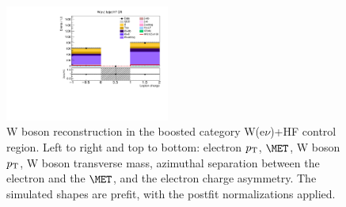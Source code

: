 \begin{figure}[tbp]
\begin{center}
    \includegraphics[width=0.48\textwidth]{figures/wlnhbb2016/boosted/WenWHHeavyFlavorFJCR_lepton1Charge.pdf}
    \caption{W boson reconstruction in the boosted category W(e$\nu$)+HF control region.
    Left to right and top to bottom: electron $p_{\mathrm{T}}$, $\MET$, W boson $p_{\mathrm{T}}$, W boson transverse mass,
    azimuthal separation between the electron and the $\MET$, and the electron charge asymmetry.
    The simulated shapes are prefit, with the postfit normalizations applied.}
    \label{fig:boost_WenHF_WBosons}
  \end{center}
\end{figure}
\clearpage

